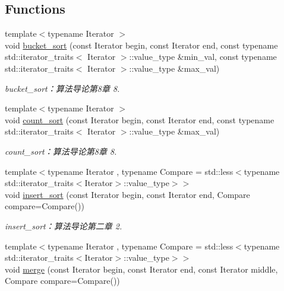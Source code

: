 \subsection*{Functions}
\begin{DoxyCompactItemize}
\item 
{\footnotesize template$<$typename Iterator $>$ }\\void \hyperlink{namespace_introdunction_to_algorithm_1_1_sort_algorithm_a3f2eccf64da97706fbd1025d54c5bfb3}{bucket\+\_\+sort} (const Iterator begin, const Iterator end, const typename std\+::iterator\+\_\+traits$<$ Iterator $>$\+::value\+\_\+type \&min\+\_\+val, const typename std\+::iterator\+\_\+traits$<$ Iterator $>$\+::value\+\_\+type \&max\+\_\+val)
\begin{DoxyCompactList}\small\item\em bucket\+\_\+sort：算法导论第8章 8. \end{DoxyCompactList}\item 
{\footnotesize template$<$typename Iterator $>$ }\\void \hyperlink{namespace_introdunction_to_algorithm_1_1_sort_algorithm_a46002ebd64c9fcd98f3bb77713e8bdd3}{count\+\_\+sort} (const Iterator begin, const Iterator end, const typename std\+::iterator\+\_\+traits$<$ Iterator $>$\+::value\+\_\+type \&max\+\_\+val)
\begin{DoxyCompactList}\small\item\em count\+\_\+sort：算法导论第8章 8. \end{DoxyCompactList}\item 
{\footnotesize template$<$typename Iterator , typename Compare  = std\+::less$<$typename std\+::iterator\+\_\+traits$<$\+Iterator$>$\+::value\+\_\+type$>$$>$ }\\void \hyperlink{namespace_introdunction_to_algorithm_1_1_sort_algorithm_a244ca5a48266ea48f1d52e5436eaee84}{insert\+\_\+sort} (const Iterator begin, const Iterator end, Compare compare=Compare())
\begin{DoxyCompactList}\small\item\em insert\+\_\+sort：算法导论第二章 2. \end{DoxyCompactList}\item 
{\footnotesize template$<$typename Iterator , typename Compare  = std\+::less$<$typename std\+::iterator\+\_\+traits$<$\+Iterator$>$\+::value\+\_\+type$>$$>$ }\\void \hyperlink{namespace_introdunction_to_algorithm_1_1_sort_algorithm_a907f7aca2cde6c79983673ce07167278}{merge} (const Iterator begin, const Iterator end, const Iterator middle, Compare compare=Compare())

\end{DoxyCompactItemize}
